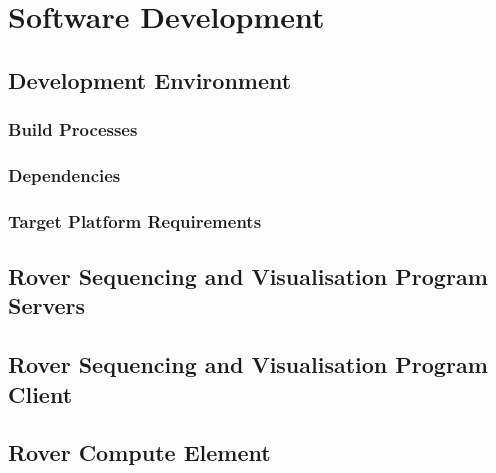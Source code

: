 \section{Software Development}
  \subsection{Development Environment}
    \subsubsection{Build Processes}
    \subsubsection{Dependencies}
    \subsubsection{Target Platform Requirements} 
    
  \subsection{Rover Sequencing and Visualisation Program Servers}
  \subsection{Rover Sequencing and Visualisation Program Client}
  \subsection{Rover Compute Element}
    